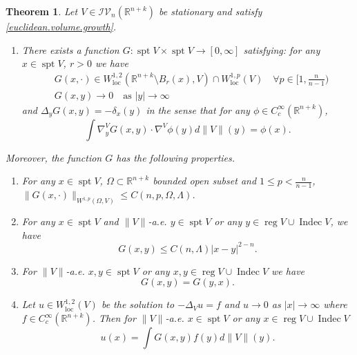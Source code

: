 \documentclass[11pt]{amsart}
\newtheorem{theorem}{Theorem}[section]
\theoremstyle{definition}
\newcommand{\R}{\mathbb{R}}
\newcommand{\IV}{\mathcal{IV}}
\newcommand{\loc}{\mathrm{loc}}
\DeclareMathOperator{\spt}{spt}
\DeclareMathOperator{\reg}{reg}
\DeclareMathOperator{\indec}{Indec}
\begin{document}
\begin{theorem}\label{globalGreenvarifolds} 
	Let $V\in \IV_n(\R^{n+k})$ be stationary and satisfy \eqref{euclidean.volume.growth}.
	\begin{enumerate}
		\item[(i)]  There exists a function $G:\spt V\times \spt V\to [0,\infty]$
		satisfying: for any $x\in \spt V$, $r>0$ we have 
		\begin{align}
			&G(x,\cdot)\in W_\loc^{1,2}( \R^{n+k}\setminus B_{r}(x),V)\cap W_\loc^{1,p}(V)\quad \forall p\in [1,\frac{n}{n-1})\label{w1p.global}\\
			&G(x,y)\to0\quad\text{as }|y|\to\infty \label{decay.global}
		\end{align}
		and  $\Delta_y G(x,y)=-\delta_x(y)$ in the sense that for any $\phi\in C_c^\infty(\R^{n+k})$, 
		\begin{equation}\label{delta.global}
			\int\nabla _y^V G(x,y) \cdot \nabla^V\phi(y)d\|V\|(y)=\phi(x).
		\end{equation}
	\end{enumerate}
	Moreover, the function $G$ has the following properties.
	\begin{enumerate}
		\item[(ii)] For any $x\in \spt V$, $\Omega\subset\R^{n+k}$ bounded open subset and $1\le p<\frac{n}{n-1}$, $\|G(x,\cdot)\|_{W^{1,p}(\Omega,V)}\le C(n,p,\Omega,\Lambda)$.
		
		\item[(iii)] For any $x\in \spt V$ and $\|V\|$-a.e. $y\in\spt V$ or any $y\in \reg V\cup \indec V$, we have
		\begin{equation}\label{rough.upper.bound}
			G(x,y)\le C(n,\Lambda)|x-y|^{2-n}.
		\end{equation}
		
		\item[(iv)] For $\|V\|$-a.e. $x,y\in \spt V$ or any $x,y\in \reg V\cup \indec V$ we have
		\begin{equation}
			\label{symmetry} G(x,y)=G(y,x).
		\end{equation}
		\item[(v)]  Let $u\in W_\loc^{1,2}(V)$ be the solution to $-\Delta_V u=f$ and $u\to0$ as $|x|\to\infty$ where $f\in C_c^\infty (\R^{n+k})$. 
		Then for $\|V\|$-a.e. $x\in \spt V$ or any $x\in \reg V\cup \indec V$
		\begin{equation}\label{representation} 
			u(x)=\int G(x,y)f(y)d\|V\|(y).
		\end{equation}
	\end{enumerate}
\end{theorem}
\end{document}
